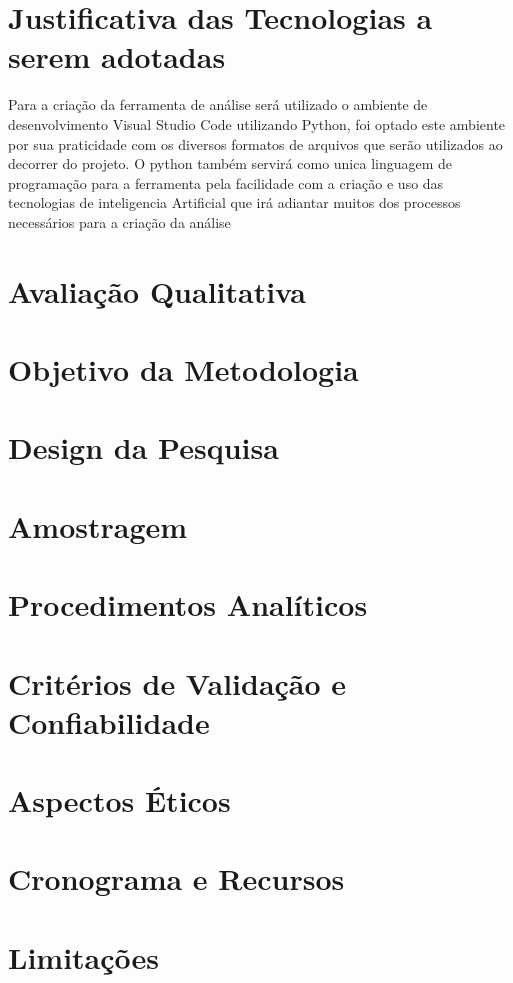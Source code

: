 \section{Justificativa das Tecnologias a serem adotadas}

Para a criação da ferramenta de análise será utilizado o ambiente de desenvolvimento Visual Studio Code utilizando Python, foi optado este ambiente por sua praticidade com os diversos formatos de arquivos que serão utilizados ao decorrer do projeto. 
O python também servirá como unica linguagem de programação para a ferramenta pela facilidade com a criação e uso das tecnologias de inteligencia Artificial que irá adiantar muitos dos processos necessários para a criação da análise

\section{Avaliação Qualitativa}




\section{Objetivo da Metodologia}



\section{Design da Pesquisa}



\section{Amostragem}



\section{Procedimentos Analíticos}



\section{Critérios de Validação e Confiabilidade}



\section{Aspectos Éticos}



\section{Cronograma e Recursos}



\section{Limitações}

